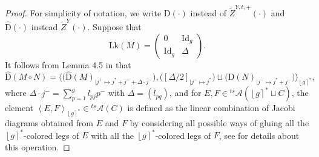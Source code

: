 \documentclass[10pt]{amsart}
\numberwithin{equation}{section}
\numberwithin{equation}{section}
\theoremstyle{definition}
\begin{document}
\begin{proof}
For simplicity of notation, we write $\text{D}(\cdot)$ instead of $\widetilde{Z}^{Y,t,+}(\cdot)$ and $\hat{\text{D}}(\cdot)$ instead $\widetilde{Z}^Y(\cdot)$.  Suppose that
\begin{equation*}
\text{Lk}(M)=\left( \begin{smallmatrix} 0 & \text{Id}_g\\ \text{Id}_g & \Delta \end{smallmatrix} \right).
\end{equation*}
It follows from Lemma 4.5 in \cite{MR2403806}  that 
\begin{equation}\label{inneraarh}
\hat{\text{D}}(M\circ N)=\Bigg\langle \Big(\hat{\text{D}}(M)_{|j^+\mapsto j^*+j^+ +{\Delta}\cdot j^-}\Big) , \Big(\left[{\Delta}/{2}\right]_{|j^-\mapsto j^*}\Big)\sqcup\Big(\hat{\text{D}}(N)_{|j^-\mapsto j^*+j^-}\Big)\Bigg\rangle_{\left\lfloor g\right\rceil^*},
\end{equation}
where ${\Delta}\cdot j^-=\sum_{p=1}^g l_{pj}p^-$ with ${\Delta}=(l_{pq})$, and for $E,F\in {}^{ts}\!\!\mathcal{A}(\left\lfloor g\right\rceil^*\sqcup C)$, the element $\left\langle E,F\right\rangle_{\left\lfloor g\right\rceil^*}\in {}^{ts}\!\!\mathcal{A}( C)$ is defined as the linear combination of  Jacobi diagrams obtained from $E$ and $F$ by considering all  possible ways of gluing all the $\left\lfloor g\right\rceil^*$-colored legs of $E$ with all the $\left\lfloor g\right\rceil^*$-colored legs of $F$, see \cite{MR1931167,MR1931168} for details about this operation.


\end{proof}
\end{document}
